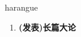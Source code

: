 
\begin{frame}
{\huge harangue}
\begin{center}
\begin{enumerate}\Large
  \item \textbf{(发表)长篇大论}
\end{enumerate}
\end{center}
\end{frame}
